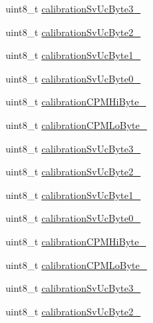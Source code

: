 \begin{DoxyCompactItemize}
uint8\-\_\-t \hyperlink{struct_g_q_l_l_c_1_1_g_q_g_m_c_1_1cfg__data__t_ae8c34b08a0a153a59035a26e5d5fbb52}{calibration\-Sv\-Uc\-Byte3\-\_}
\item 
uint8\-\_\-t \hyperlink{struct_g_q_l_l_c_1_1_g_q_g_m_c_1_1cfg__data__t_a255ba616985ce3e095eee4cc5b32edc9}{calibration\-Sv\-Uc\-Byte2\-\_}
\item 
uint8\-\_\-t \hyperlink{struct_g_q_l_l_c_1_1_g_q_g_m_c_1_1cfg__data__t_a21921759c5093dfcecfd4884ba6afd66}{calibration\-Sv\-Uc\-Byte1\-\_}
\item 
uint8\-\_\-t \hyperlink{struct_g_q_l_l_c_1_1_g_q_g_m_c_1_1cfg__data__t_a196e741a7f6ab2eb32073ed31f27b9cc}{calibration\-Sv\-Uc\-Byte0\-\_}
\item 
uint8\-\_\-t \hyperlink{struct_g_q_l_l_c_1_1_g_q_g_m_c_1_1cfg__data__t_a2b72451f47bd71787107cdd20f6786c8}{calibration\-C\-P\-M\-Hi\-Byte\-\_}
\item 
uint8\-\_\-t \hyperlink{struct_g_q_l_l_c_1_1_g_q_g_m_c_1_1cfg__data__t_a6db97cdcd9524a143c4eb7c0d135b406}{calibration\-C\-P\-M\-Lo\-Byte\-\_}
\item 
uint8\-\_\-t \hyperlink{struct_g_q_l_l_c_1_1_g_q_g_m_c_1_1cfg__data__t_ab7daa679e10c5c918aa34b23badd5f51}{calibration\-Sv\-Uc\-Byte3\-\_}
\item 
uint8\-\_\-t \hyperlink{struct_g_q_l_l_c_1_1_g_q_g_m_c_1_1cfg__data__t_a3ac90fa88db04080bf1d88b85d3e0d71}{calibration\-Sv\-Uc\-Byte2\-\_}
\item 
uint8\-\_\-t \hyperlink{struct_g_q_l_l_c_1_1_g_q_g_m_c_1_1cfg__data__t_aa4b9d6f36731969dbdfef1208e1b9917}{calibration\-Sv\-Uc\-Byte1\-\_}
\item 
uint8\-\_\-t \hyperlink{struct_g_q_l_l_c_1_1_g_q_g_m_c_1_1cfg__data__t_af997d554f0c6a009ac180a8f41a17b2d}{calibration\-Sv\-Uc\-Byte0\-\_}
\item 
uint8\-\_\-t \hyperlink{struct_g_q_l_l_c_1_1_g_q_g_m_c_1_1cfg__data__t_a21440cd2433827aacbddb9fcc678d6ef}{calibration\-C\-P\-M\-Hi\-Byte\-\_}
\item 
uint8\-\_\-t \hyperlink{struct_g_q_l_l_c_1_1_g_q_g_m_c_1_1cfg__data__t_a2b7efff2af0bc28b83f09425a05b5d3d}{calibration\-C\-P\-M\-Lo\-Byte\-\_}
\item 
uint8\-\_\-t \hyperlink{struct_g_q_l_l_c_1_1_g_q_g_m_c_1_1cfg__data__t_a1cd80740465d6373a0256836aecd7735}{calibration\-Sv\-Uc\-Byte3\-\_}
\item 
uint8\-\_\-t \hyperlink{struct_g_q_l_l_c_1_1_g_q_g_m_c_1_1cfg__data__t_abf5122dc37e13fe64a37c7b9b4bde6b1}{calibration\-Sv\-Uc\-Byte2\-\_}

\end{DoxyCompactItemize}

